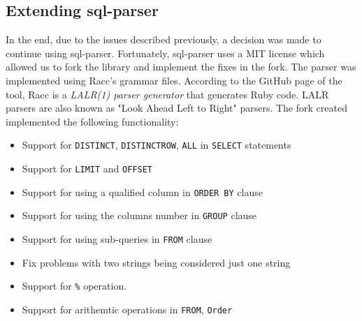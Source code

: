 \subsection{Extending sql-parser}

In the end, due to the issues described previously, a decision was made to continue using sql-parser. Fortunately, sql-parser uses a MIT license which allowed us to fork the library and implement the fixes in the fork. The parser was implemented using Racc's grammar files. According to the GitHub page of the tool, Racc is a \textit{LALR(1) parser generator} that generates Ruby code. LALR parsers are also known as "Look Ahead Left to Right" parsers. The fork created implemented the following functionality:
\begin{itemize}
    \item Support for \texttt{DISTINCT}, \texttt{DISTINCTROW}, \texttt{ALL} in \texttt{SELECT} statements
    \item Support for \texttt{LIMIT} and \texttt{OFFSET}
    \item Support for using a qualified column in \texttt{ORDER BY} clause
    \item Support for using the columns number in \texttt{GROUP} clause
    \item Support for using sub-queries in \texttt{FROM} clause
    \item Fix problems with two strings being considered just one string
    \item Support for \texttt{\%} operation.
    \item Support for arithemtic operations in \texttt{FROM}, \texttt{Order}
\end{itemize}

